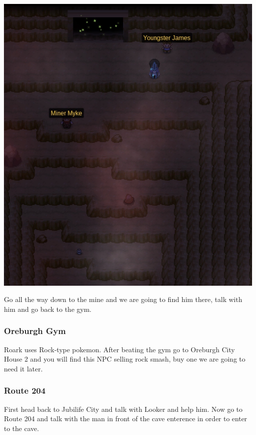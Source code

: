 \documentclass[11pt]{article}
\begin{document}
\includegraphics[width=\textwidth]{walkthrough/Sinnoh/oreburgh_mine}

Go all the way down to the mine and we are going to find him there,
talk with him and go back to the gym.




\subsubsection{Oreburgh Gym}\label{subsubsec:oreburgh-gym}
Roark uses Rock-type pokemon.
After beating the gym go to Oreburgh City House 2 and you will find this NPC
selling rock smash, buy one we are going to need it later.

\subsubsection{Route 204}\label{subsubsec:route_204}
First head back to Jubilife City and talk with Looker and help him.
Now go to Route 204 and talk with the man in front of the cave enterence
in order to enter to the cave.
\end{document}
